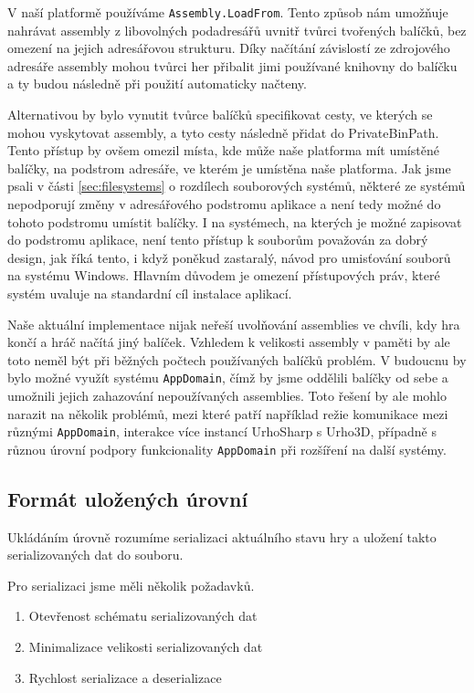 V naší platformě používáme \texttt{Assembly.LoadFrom}. Tento způsob nám umožňuje nahrávat assembly z libovolných podadresářů uvnitř tvůrci tvořených balíčků, bez omezení na jejich adresářovou strukturu. Díky načítání závislostí ze zdrojového adresáře assembly mohou tvůrci her přibalit jimi používané knihovny do balíčku a ty budou následně při použití automaticky načteny.

Alternativou by bylo vynutit tvůrce balíčků specifikovat cesty, ve kterých se mohou vyskytovat assembly, a tyto cesty následně přidat do PrivateBinPath. Tento přístup by ovšem omezil místa, kde může naše platforma mít umístěné balíčky, na podstrom adresáře, ve kterém je umístěna naše platforma. Jak jsme psali v části \ref{sec:filesystems} o rozdílech souborových systémů, některé ze systémů nepodporují změny v adresářového podstromu aplikace a není tedy možné do tohoto podstromu umístit balíčky. I na systémech, na kterých je možné zapisovat do podstromu aplikace, není tento přístup k souborům považován za dobrý design, jak říká tento, i když poněkud zastaralý, návod pro umisťování souborů na systému Windows\citep{site:windowsappfiles}. Hlavním důvodem je omezení přístupových práv, které systém uvaluje na standardní cíl instalace aplikací.

Naše aktuální implementace nijak neřeší uvolňování assemblies ve chvíli, kdy hra končí a hráč načítá jiný balíček. Vzhledem k velikosti assembly v paměti by ale toto neměl být při běžných počtech používaných balíčků problém. V budoucnu by bylo možné využít systému \texttt{AppDomain}, čímž by jsme oddělili balíčky od sebe a umožnili jejich zahazování nepoužívaných assemblies. Toto řešení by ale mohlo narazit na několik problémů, mezi které patří například režie komunikace mezi různými \texttt{AppDomain}, interakce více instancí UrhoSharp s Urho3D, případně s různou úrovní podpory funkcionality \texttt{AppDomain} při rozšíření na další systémy.

\subsection{Formát uložených úrovní}
Ukládáním úrovně rozumíme serializaci aktuálního stavu hry a uložení takto serializovaných dat do souboru.

Pro serializaci jsme měli několik požadavků. 
\begin{enumerate}
	\item Otevřenost schématu serializovaných dat
	\item Minimalizace velikosti serializovaných dat
	\item Rychlost serializace a deserializace
\end{enumerate}


